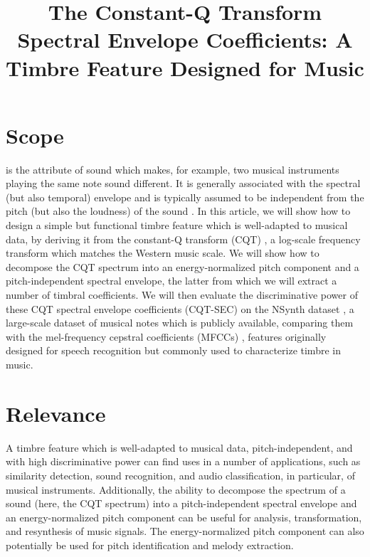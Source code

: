 \documentclass[journal]{IEEEtran}
\begin{document}
\title{The Constant-Q Transform Spectral Envelope Coefficients: A Timbre Feature Designed for Music}

\maketitle

\section{Scope}

 is the attribute of sound which makes, for example, two musical instruments playing the same note sound different. It is generally associated with the spectral (but also temporal) envelope and is typically assumed to be independent from the pitch (but also the loudness) of the sound \cite{moore2004}. In this article, we will show how to design a simple but functional timbre feature which is well-adapted to musical data, by deriving it from the constant-Q transform (CQT) \cite{brown1991, brown1992}, a log-scale frequency transform which matches the Western music scale. We will show how to decompose the CQT spectrum into an energy-normalized pitch component and a pitch-independent spectral envelope, the latter from which we will extract a number of timbral coefficients. We will then evaluate the discriminative power of these CQT spectral envelope coefficients (CQT-SEC) on the NSynth dataset \cite{engel2017}, a large-scale dataset of musical notes which is publicly available, comparing them with the mel-frequency cepstral coefficients (MFCCs) \cite{mermelstein1976}, features originally designed for speech recognition but commonly used to characterize timbre in music. 


\section{Relevance}

A timbre feature which is well-adapted to musical data, pitch-independent, and with high discriminative power can find uses in a number of applications, such as similarity detection, sound recognition, and audio classification, in particular, of musical instruments. Additionally, the ability to decompose the spectrum of a sound (here, the CQT spectrum) into a pitch-independent spectral envelope and an energy-normalized pitch component can be useful for analysis, transformation, and resynthesis of music signals. The energy-normalized pitch component can also potentially be used for pitch identification and melody extraction. 
\end{document}
